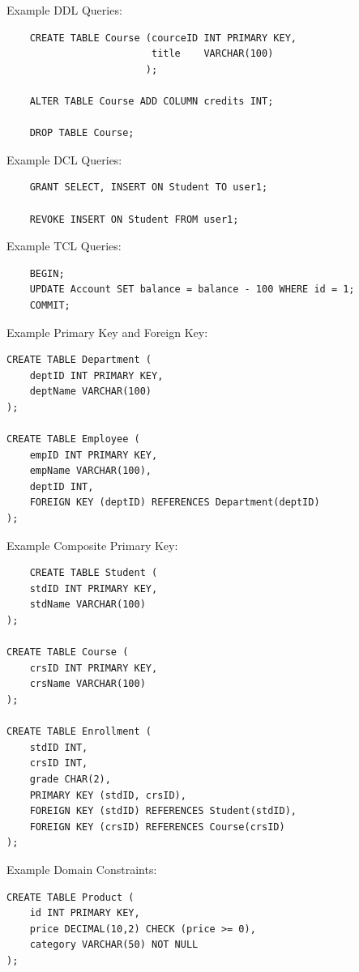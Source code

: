 \documentclass{article}
\begin{document}
\newpage
Example DDL Queries:
\begin{verbatim}
    CREATE TABLE Course (courceID INT PRIMARY KEY,
                         title    VARCHAR(100)
                        );

    ALTER TABLE Course ADD COLUMN credits INT;

    DROP TABLE Course;
\end{verbatim}

Example DCL Queries:
\begin{verbatim}
    GRANT SELECT, INSERT ON Student TO user1;

    REVOKE INSERT ON Student FROM user1;
\end{verbatim}

Example TCL Queries:
\begin{verbatim}
    BEGIN;
    UPDATE Account SET balance = balance - 100 WHERE id = 1;
    COMMIT; 
\end{verbatim}
Example Primary Key and Foreign Key:
\begin{verbatim}
CREATE TABLE Department (
    deptID INT PRIMARY KEY,
    deptName VARCHAR(100)
);

CREATE TABLE Employee (
    empID INT PRIMARY KEY,
    empName VARCHAR(100),
    deptID INT,
    FOREIGN KEY (deptID) REFERENCES Department(deptID)
);
\end{verbatim}

Example Composite Primary Key:
\begin{verbatim}
    CREATE TABLE Student (
    stdID INT PRIMARY KEY,
    stdName VARCHAR(100)
);

CREATE TABLE Course (
    crsID INT PRIMARY KEY,
    crsName VARCHAR(100)
);

CREATE TABLE Enrollment (
    stdID INT,
    crsID INT,
    grade CHAR(2),
    PRIMARY KEY (stdID, crsID),
    FOREIGN KEY (stdID) REFERENCES Student(stdID),
    FOREIGN KEY (crsID) REFERENCES Course(crsID)
);
\end{verbatim}

Example Domain Constraints:
\begin{verbatim}
CREATE TABLE Product (
    id INT PRIMARY KEY,
    price DECIMAL(10,2) CHECK (price >= 0),
    category VARCHAR(50) NOT NULL
);
\end{verbatim}


\end{document}
